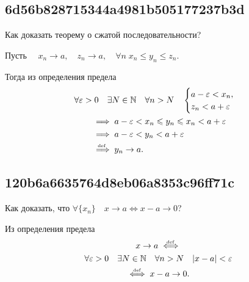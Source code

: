 \documentclass[11pt, a5paper]{article}
\newenvironment{note}[1]{\goodbreak\par\subsection{\hfill \color{lightgray}\tiny #1}}{}
\newenvironment{cloze}[2][\ldots]{\begin{leftbar}}{\end{leftbar}}
\begin{document}
    \begin{note}{6d56b828715344a4981b505177237b3d}
        Как доказать теорему о сжатой последовательности?

        \begin{cloze}{1}
            Пусть \( \quad x_n \to a, \quad z_n \to a, \quad
            \forall n\; x_n \leqslant y_n \leqslant z_n. \)

            Тогда из определения предела \[
                \begin{gathered}
                    \forall \varepsilon > 0 \quad \exists N \in \mathbb N \quad
                    \forall n > N \quad \begin{cases}
                        a - \varepsilon < x_n, \\
                        z_n < a + \varepsilon
                    \end{cases} \\
                    \begin{aligned}
                        &\implies a - \varepsilon < x_n \leqslant y_n \leqslant
                        x_n < a + \varepsilon \\
                        &\implies a - \varepsilon < y_n < a + \varepsilon \\
                        &\overset{\!\!\text{\tiny def}}\implies y_n \to a.
                    \end{aligned}
                \end{gathered}
            \]
        \end{cloze}
    \end{note}

    \begin{note}{120b6a6635764d8eb06a8353c96ff71c}
        Как доказать, что \( \forall \{ x_n \} \quad x \to a \iff x - a \to 0 \)?

        \begin{cloze}{1}
            Из определения предела \begin{multline*}
                x \to a \overset{\hspace{-1pt}\text{\tiny def}}\iff  \\
                \forall \varepsilon > 0 \quad \exists N \in \mathbb N \quad
                \forall n > N \quad |x - a| < \varepsilon \\
                \overset{\hspace{-1pt}\text{\tiny def}}\iff x - a \to 0.
            \end{multline*}
        \end{cloze}
    \end{note}
\end{document}
